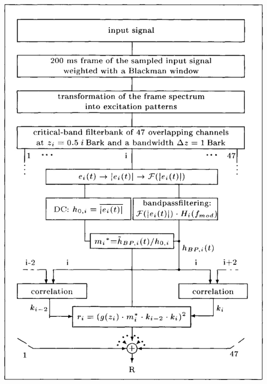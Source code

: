 \documentclass{beamer}
\begin{document}
\begin{frame}
\begin{columns}
\begin{column}{0.5\textwidth}
      \includegraphics[width=\textwidth]{model}
    \end{column}
  \end{columns}
\end{frame}
\end{document}
